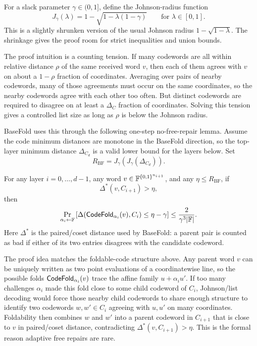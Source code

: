 For a slack parameter $\gamma\in(0,1]$, define the Johnson-radius function
\[
  J_\gamma(\lambda)
  =
  1-\sqrt{1-\lambda(1-\gamma)}
  \qquad\text{for }\lambda\in[0,1].
\]
This is a slightly shrunken version of the usual Johnson radius
$1-\sqrt{1-\lambda}$.  The shrinkage gives the proof room for strict
inequalities and union bounds.

The proof intuition is a counting tension.  If many codewords are all within
relative distance $\rho$ of the same received word $v$, then each of them agrees
with $v$ on about a $1-\rho$ fraction of coordinates.  Averaging over pairs of
nearby codewords, many of those agreements must occur on the same coordinates,
so the nearby codewords agree with each other too often.  But distinct codewords
are required to disagree on at least a $\Delta_C$ fraction of coordinates.
Solving this tension gives a controlled list size as long as
$\rho$ is below the Johnson radius.

BaseFold uses this through the following one-step no-free-repair lemma.  Assume
the code minimum distances are monotone in the BaseFold direction, so the
top-layer minimum distance $\Delta_{C_d}$ is a valid lower bound for the layers
below.
Set
\[
  R_{\mathrm{BF}}
  =
  J_\gamma(J_\gamma(\Delta_{C_d})).
\]

\begin{lemma}
\label{lem:one-step-no-free-repair}
For any layer $i=0,\ldots,d-1$, any word
$v\in\mathbb{F}^{\{0,1\}^{n_{i+1}}}$, and any $\eta\le R_{\mathrm{BF}}$, if
\[
  \Delta^*(v,C_{i+1})>\eta,
\]
then
\[
  \Pr_{\alpha_i\leftarrow\mathbb{F}}
  \left[
    \Delta(\mathsf{CodeFold}_{\alpha_i}(v),C_i)
    \le
    \eta-\gamma
  \right]
  \le
  \frac{2}{\gamma^3|\mathbb{F}|}.
\]
Here $\Delta^*$ is the paired/coset distance used by BaseFold: a parent pair is
counted as bad if either of its two entries disagrees with the candidate
codeword.
\end{lemma}

The proof idea matches the foldable-code structure above.  Any parent word
$v$ can be uniquely written as two point evaluations of a coordinatewise line,
so the possible folds $\mathsf{CodeFold}_{\alpha_i}(v)$ trace the affine family
$u+\alpha_i u'$.  If too many challenges $\alpha_i$ made this fold close to
some child codeword of $C_i$, Johnson/list decoding would force those nearby
child codewords to share enough structure to identify two codewords
$w,w'\in C_i$ agreeing with $u,u'$ on many coordinates.  Foldability then
combines $w$ and $w'$ into a parent codeword in $C_{i+1}$ that is close to
$v$ in paired/coset distance, contradicting
$\Delta^*(v,C_{i+1})>\eta$.  This is the formal reason adaptive free repairs
are rare.

